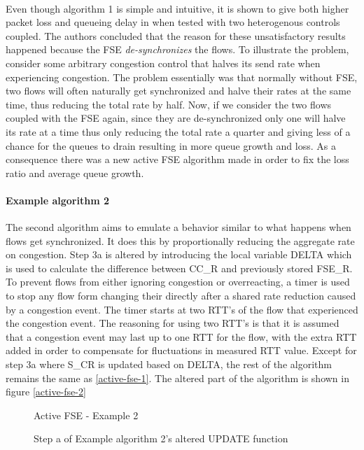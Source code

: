\paragraph{}
Even though algorithm 1 is simple and intuitive, it is shown to give both higher packet loss and queueing delay in \cite{10.1145/2740070.2630089} when tested with two heterogenous controls coupled. 
The authors concluded that the reason for these unsatisfactory results happened because the FSE \textit{de-synchronizes} the flows.
To illustrate the problem, consider some arbitrary congestion control that halves its send rate when experiencing congestion.
The problem essentially was that normally without FSE, two flows will often naturally get synchronized and halve their rates at the same time, thus reducing the total rate by half.
Now, if we consider the two flows coupled with the FSE again, since they are de-synchronized only one will halve its rate at a time thus only reducing the total rate a quarter and giving less of a chance for the queues to drain resulting in more queue growth and loss.
As a consequence there was a new active FSE algorithm made in order to fix the loss ratio and average queue growth.
\paragraph{Example algorithm 2}
The second algorithm aims to emulate a behavior similar to what happens when flows get synchronized.
It does this by proportionally reducing the aggregate rate on congestion.
Step 3a is altered by introducing the local variable DELTA which is used to calculate the difference between CC\_R and previously stored FSE\_R. 
To prevent flows from either ignoring congestion or overreacting, a timer is used to stop any flow form changing their directly after a shared rate reduction caused by a congestion event. 
The timer starts at two RTT's of the flow that experienced the congestion event.
The reasoning for using two RTT's is that it is assumed that a congestion event may last up to one RTT for the flow, with the extra RTT added in order to compensate for fluctuations in measured RTT value.
Except for step 3a where S\_CR is updated based on DELTA, the rest of the algorithm remains the same as \vref{active-fse-1}.
The altered part of the algorithm is shown in figure \vref{active-fse-2}

\begin{figure}
\begin{algorithm}[H]
    \SetAlgoLined
    \caption{Active FSE - Example 2}
\end{algorithm}
\caption{Step a of Example algorithm 2's altered UPDATE function}
\label{active-fse-2}
\end{figure}
